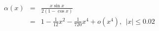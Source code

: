 \documentclass {article}
\begin{document}
\begin{eqnarray*}
\alpha (x) &=& \frac{x\sin x}{2(1-\cos x)} \\
&=& 1 - \frac{1}{12}x^2 -\frac{1}{720} x^4 + o(x^4),\ \ |x| \leq 0.02\\
\end{eqnarray*}
\end{document}
